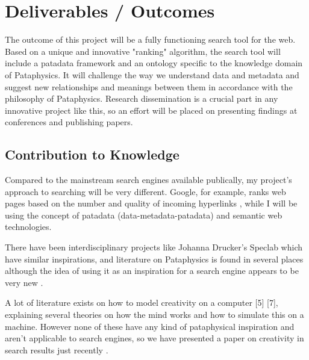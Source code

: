 \section{Deliverables / Outcomes}

The outcome of this project will be a fully functioning search tool for the web. Based on a unique and innovative "ranking" algorithm, the search tool will include a patadata framework and an ontology specific to the knowledge domain of Pataphysics. It will challenge the way we understand data and metadata and suggest new relationships and meanings between them in accordance with the philosophy of Pataphysics.  Research dissemination is a crucial part in any innovative project like this, so an effort will be placed on presenting findings at conferences and publishing papers.

\subsection{Contribution to Knowledge}

Compared to the mainstream search engines available publically, my project's approach to searching will be very different. Google, for example, ranks web pages based on the number and quality of incoming hyperlinks \citep{Google2012}, while I will be using the concept of patadata (data-metadata-patadata) and semantic web technologies.

There have been interdisciplinary projects like Johanna Drucker's Speclab \citep{Drucker2009} which have similar inspirations, and literature on Pataphysics is found in several places \citep{Bok2002, Hugill2012a} although the idea of using it as an inspiration for a search engine appears to be very new \citep{Hendler2013}.

A lot of literature exists on how to model creativity on a computer [5] [7], explaining several theories on how the mind works and how to simulate this on a machine. However none of these have any kind of pataphysical inspiration and aren't applicable to search engines, so we have presented a paper on creativity in search results just recently \citep{Raczinski2013}.
